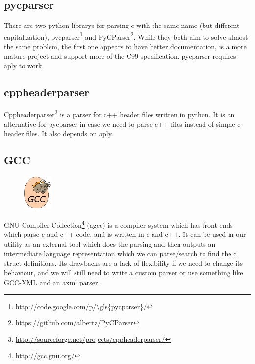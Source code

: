 \subsection{\gls{pycparser}}
\label{sec:pre:pycparser}
There are two \Gls{python} \glspl{library} for parsing \Gls{c} with the same name (but different
capitalization), \gls{pycparser}\footnote{\url{http://code.google.com/p/\gls{pycparser}/}}
and PyCParser\footnote{\url{https://github.com/albertz/PyCParser}}. While they
both aim to solve almost the same problem, the first one appears to have better
documentation, is a more mature project and support more of the C99
specification. \gls{pycparser} requires \Gls{aply} to work.

\subsection{cppheaderparser}
Cppheaderparser\footnote{\url{http://sourceforge.net/projects/cppheaderparser/}}
is a \gls{parser} for \Gls{c++} \gls{header} files written in \Gls{python}. It is an alternative for
\gls{pycparser} in case we need to parse \Gls{c++} files instead of simple \Gls{c} \gls{header} files.
It also depends on \Gls{aply}.

\subsection{GCC}
\label{sec:pre:gcc}
\begin{figure}
	\vspace{-20pt}
	\includegraphics[width=1.5cm]{./planning/img/gcc_logo}
	\vspace{-20pt}
\end{figure}
GNU Compiler Collection\footnote{\url{http://gcc.gnu.org/}} (\Gls{agcc}) is a
compiler system which has front ends which parse \Gls{c} and \Gls{c++} code, and is written
in \Gls{c} and \Gls{c++}. It can be used in our \gls{utility} as an external tool which does the
parsing and then outputs an intermediate language representation which we can
parse/search to find the \Gls{c} \gls{struct} definitions. Its drawbacks are a lack of
flexibility if we need to change its behaviour, and we will still need to write
a custom \gls{parser} or use something like \gls{GCC-XML} and an \gls{axml} \gls{parser}.

